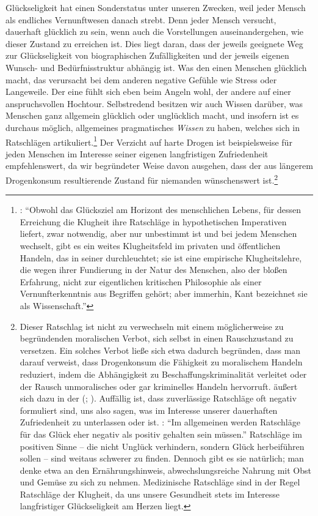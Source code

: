 Glückseligkeit hat einen Sonderstatus unter unseren Zwecken, weil jeder Mensch
als endliches Vernunftwesen danach strebt. Denn jeder Mensch versucht, dauerhaft
glücklich zu sein, wenn auch die Vorstellungen auseinandergehen, wie dieser Zustand zu
erreichen ist. Dies liegt daran, dass der jeweils geeignete Weg zur
Glückseligkeit von biographischen Zufälligkeiten und der jeweils eigenen Wunsch-
und Bedürfnisstruktur abhängig ist. Was den einen Menschen glücklich macht, das
verursacht bei dem anderen negative Gefühle wie Stress oder Langeweile.
Der eine fühlt sich eben beim Angeln wohl, der andere auf einer anspruchsvollen
Hochtour. Selbstredend besitzen wir auch Wissen darüber, was Menschen ganz
allgemein glücklich oder unglücklich macht, und insofern ist es durchaus
möglich, allgemeines pragmatisches \emph{Wissen} zu haben, welches sich in
Ratschlägen artikuliert.\footnote{\cite[Vgl.][98]{Brandt:KlugheitbeiKant2005}:
\enquote{Obwohl das Glücksziel am Horizont des menschlichen Lebens, für dessen Erreichung die
Klugheit ihre Ratschläge in hypothetischen Imperativen liefert, zwar notwendig,
aber nur unbestimmt ist und bei jedem Menschen wechselt, gibt es ein weites
Klugheitsfeld im privaten und öffentlichen Handeln, das  in
seiner  durchleuchtet; sie ist eine empirische
Klugheitslehre, die wegen ihrer Fundierung in der Natur des Menschen, also der
bloßen Erfahrung, nicht zur eigentlichen kritischen Philosophie als einer
Ver\-nunft\-er\-kennt\-nis aus Begriffen gehört; aber immerhin, Kant bezeichnet
sie als Wissenschaft.}} Der Verzicht auf harte Drogen ist beispielsweise für jeden
Menschen im Interesse seiner eigenen langfristigen Zufriedenheit empfehlenswert,
da wir begründeter Weise davon
ausgehen, dass der aus längerem Drogenkonsum resultierende Zustand für niemanden
wünschenswert ist.\footnote{Dieser Ratschlag ist nicht zu verwechseln mit einem
möglicherweise zu begründenden moralischen Verbot, sich selbst in einen
Rauschzustand zu versetzen. Ein solches Verbot ließe sich etwa dadurch
begründen, dass man darauf verweist, dass Drogenkonsum die Fähigkeit zu
moralischem Handeln reduziert, indem die Abhängigkeit zu
Beschaffungskriminalität verleitet oder der Rausch unmoralisches oder gar
kriminelles Handeln hervorruft.  äußert sich dazu in der
 \mkbibparens{\cite[vgl.][A
80--82]{Kant:DieMetaphysikderSitten1977Tugendlehre};
\cite[][VI: 427.1--428.26]{Kant:GesammelteWerke1900ff.}}.
Auffällig ist, dass zuverlässige Ratschläge oft negativ formuliert
sind, uns also sagen, was im Interesse unserer dauerhaften Zufriedenheit zu
unterlassen oder 
ist. \cite[Vgl.][190]{Schwaiger:KategorischeundandereImperative1999}:
\enquote{Im allgemeinen werden Ratschläge für das Glück eher negativ als positiv gehalten
sein müssen.} Ratschläge im positiven Sinne -- die nicht Unglück verhindern,
sondern Glück herbeiführen sollen -- sind weitaus schwerer zu finden. Dennoch
gibt es sie natürlich; man denke etwa an den Ernährungshinweis,
abwechslungsreiche Nahrung mit Obst und Gemüse zu sich zu nehmen. Medizinische
Ratschläge sind in der Regel Ratschläge der Klugheit, da uns unsere Gesundheit
stets im Interesse langfristiger Glückseligkeit am Herzen liegt.}


